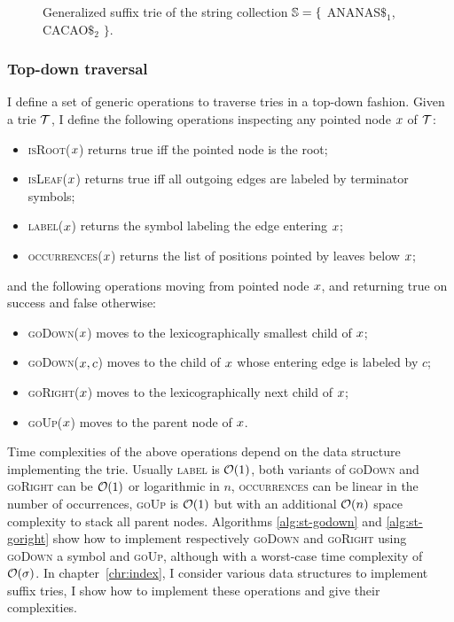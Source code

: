 \begin{figure}[h]
\caption[Example of generalized suffix trie]{Generalized suffix trie of the string collection $\mathbb {S} = \{$ {\ttfamily ANANAS$\$_1$}, {\ttfamily CACAO$\$_2$} $\}$.}
\label{fig:gstrie}
\begin{center}

\end{center}
\end{figure}

\subsubsection{Top-down traversal}

I define a set of generic operations to traverse tries in a top-down fashion.
Given a trie $\mathcal {T}$, I define the following operations inspecting any pointed node $x$ of $\mathcal {T}$:
\begin{itemize}
\item \textsc{isRoot}($x$) returns true iff the pointed node is the root;
\item \textsc{isLeaf}($x$) returns true iff all outgoing edges are labeled by terminator symbols;
\item \textsc{label}($x$) returns the symbol labeling the edge entering $x$;
\item \textsc{occurrences}($x$) returns the list of positions pointed by leaves below $x$;
\end{itemize}
and the following operations moving from pointed node $x$, and returning true on success and false otherwise:
\begin{itemize}
\item \textsc{goDown}($x$) moves to the lexicographically smallest child of $x$;
\item \textsc{goDown}($x, c$) moves to the child of $x$ whose entering edge is labeled by $c$;
\item \textsc{goRight}($x$) moves to the lexicographically next child of $x$;
\item \textsc{goUp}($x$) moves to the parent node of $x$.
\end{itemize}

Time complexities of the above operations depend on the data structure implementing the trie.
Usually \textsc{label} is $\mathcal{O}(1)$, both variants of \textsc{goDown} and \textsc{goRight} can be $\mathcal{O}(1)$ or logarithmic in $n$, \textsc{occurrences} can be linear in the number of occurrences, \textsc{goUp} is $\mathcal{O}(1)$ but with an additional $\mathcal{O}(n)$ space complexity to stack all parent nodes.
Algorithms \ref{alg:st-godown} and \ref{alg:st-goright} show how to implement respectively \textsc{goDown} and \textsc{goRight} using \textsc{goDown} a symbol and \textsc{goUp}, although with a worst-case time complexity of $\mathcal{O}(\sigma)$.
In chapter~\ref{chr:index}, I consider various data structures to implement suffix tries, I show how to implement these operations and give their complexities.

